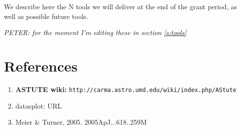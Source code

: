 \documentclass[preprint]{aastex} %
\begin{document}
We describe here the N tools we will deliver at the end of the grant
period, as well as possible future tools.

{\it  PETER: for the moment I'm editing these in section \ref{s:tools}}



\section*{References}

\begin{enumerate}
\item
{\bf ASTUTE wiki:} {\tt  http://carma.astro.umd.edu/wiki/index.php/AStute}

\item
datasplot: URL

\item
Meier \& Turner, 2005. 2005ApJ...618..259M

\end{enumerate}
\end{document}
